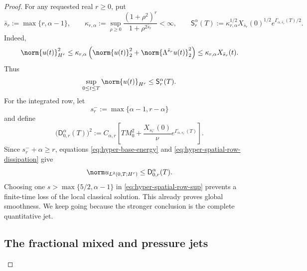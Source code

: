 \begin{proof}
For any requested real \(r\ge0\), put
\begin{equation}
 \bar s_r:=\max\{r,\alpha-1\},
 \qquad
 \kappa_{r,\alpha}
 :=\sup_{\rho\ge0}
 \frac{(1+\rho^2)^r}{1+\rho^{2\bar s_r}}<\infty,
 \qquad
 \mathsf S_r^\alpha(T)
 :=\kappa_{r,\alpha}^{1/2}X_{\bar s_r}(0)^{1/2}
    e^{\Gamma_{\alpha,\bar s_r}(T)/2}.
 \label{eq:hyper-spatial-envelope}
\end{equation}
Indeed,
\[
 \norm{u(t)}_{H^r}^2
 \le\kappa_{r,\alpha}\left(
  \norm{u(t)}_2^2+\norm{\Lambda^{\bar s_r}u(t)}_2^2
 \right)
 \le\kappa_{r,\alpha}X_{\bar s_r}(t).
\]
Thus
\begin{equation}
 \sup_{0\le t\le T}\norm{u(t)}_{H^r}
 \le\mathsf S_r^\alpha(T).
 \label{eq:hyper-spatial-bound}
\end{equation}
For the integrated row, let
\begin{equation}
 s_r^-:=\max\{\alpha-1,r-\alpha\}
 \label{eq:hyper-integrated-index}
\end{equation}
and define
\begin{equation}
 \bigl(\mathsf D_{0,r}^\alpha(T)\bigr)^2
 :=C_{\alpha,r}\left[
 TM_0^2+
 \frac{X_{s_r^-}(0)}{\nu}
 e^{\Gamma_{\alpha,s_r^-}(T)}
 \right].
 \label{eq:hyper-integrated-base}
\end{equation}
Since \(s_r^-+\alpha\ge r\), equations
\eqref{eq:hyper-base-energy} and
\eqref{eq:hyper-spatial-row-dissipation} give
\begin{equation}
 \norm u_{L^2(0,T;H^r)}
 \le\mathsf D_{0,r}^\alpha(T).
 \label{eq:hyper-integrated-base-bound}
\end{equation}
Choosing one \(s>\max\{5/2,\alpha-1\}\) in
\eqref{eq:hyper-spatial-row-sup} prevents a finite-time loss of the local
classical solution.  This already proves global smoothness.  We keep going
because the stronger conclusion is the complete quantitative jet.

\subsection{The fractional mixed and pressure jets}


\end{proof}
